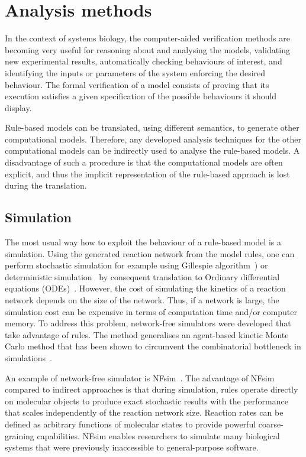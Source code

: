 \documentclass[11pt,a4paper]{report}
\begin{document}
\section{Analysis methods}\label{analysis_sec}

In the context of systems biology, the computer-aided verification methods are becoming very useful for reasoning about and analysing the models, validating new experimental results, automatically checking behaviours of interest, and identifying the inputs or parameters of the system enforcing the desired behaviour. The formal verification of a model consists of proving that its execution satisfies a given specification of the possible behaviours it should display.

Rule-based models can be translated, using different semantics, to generate other computational models. Therefore, any developed analysis techniques for the other computational models can be indirectly used to analyse the rule-based models. A disadvantage of such a procedure is that the computational models are often explicit, and thus the implicit representation of the rule-based approach is lost during the translation.

\subsection{Simulation}

The most usual way how to exploit the behaviour of a rule-based model is a simulation. Using the generated reaction network from the model rules, one can perform stochastic simulation for example using Gillespie algorithm~\cite{GILLESPIE1976403}) or deterministic simulation~\cite{Poole2000} by consequent translation to Ordinary differential equations (ODEs)~\cite{higham2008modeling}. However, the cost of simulating the kinetics of a reaction network depends on the size of the network. Thus, if a network is large, the simulation cost can be expensive in terms of computation time and/or computer memory. To address this problem, network-free simulators were developed that take advantage of rules. The method generalises an agent-based kinetic Monte Carlo method that has been shown to circumvent the combinatorial bottleneck in simulations~\cite{yang2008kinetic}.

An example of network-free simulator is NFsim~\cite{sneddon2011efficient}. The advantage of NFsim compared to indirect approaches is that during simulation, rules operate directly on molecular objects to produce exact stochastic results with the performance that scales independently of the reaction network size. Reaction rates can be defined as arbitrary functions of molecular states to provide powerful coarse-graining capabilities. NFsim enables researchers to simulate many biological systems that were previously inaccessible to general-purpose software.
\end{document}
